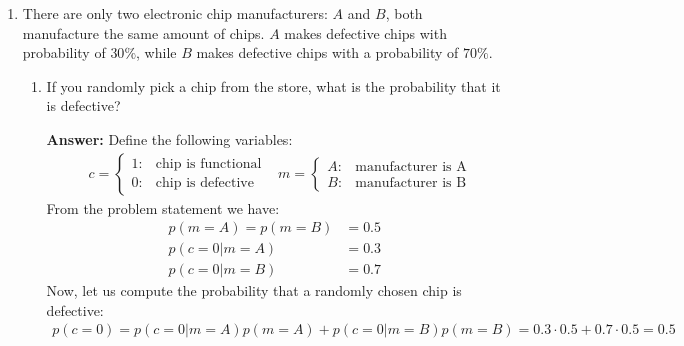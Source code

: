 \documentclass{article}
\newenvironment{QandA}{\begin{enumerate}[label=\arabic*.]}{\end{enumerate}}
\newenvironment{InnerQandA}{\begin{enumerate}[label=\roman*.]}{\end{enumerate}}
\newenvironment{answer}{\par\normalfont \textbf{Answer:}}{}
\newcommand{\g}{\vert}
\begin{document}
\begin{QandA}
    \item There are only two electronic chip manufacturers: $A$ and $B$, both manufacture the same amount of chips. $A$ makes defective chips with probability of $30\%$, while $B$ makes defective chips with a probability of $70\%$.
    \begin{InnerQandA}
        \item If you randomly pick a chip from the store, what is the probability that it is defective?
        \begin{answer}
            Define the following variables:
            \begin{align*}
                &c = \begin{cases}
                    1: &\text{chip is functional} \\
                    0: &\text{chip is defective}
                \end{cases}
                &m = \begin{cases}
                    A: &\text{manufacturer is A} \\
                    B: &\text{manufacturer is B}
                \end{cases}
            \end{align*}
            From the problem statement we have:
            \begin{align*}
                p(m=A) = p(m=B) &= 0.5 \\
                p(c=0 \g m=A) &= 0.3 \\
                p(c=0 \g m=B) &= 0.7
            \end{align*}
            Now, let us compute the probability that a randomly chosen chip is defective:
            \begin{align*}
                p(c=0) = p(c=0 \g m=A)p(m=A) + p(c=0 \g m=B)p(m=B) = 0.3 \cdot 0.5 + 0.7 \cdot 0.5 = 0.5 
            \end{align*}
        \end{answer}


\end{InnerQandA}
\end{QandA}
\end{document}
